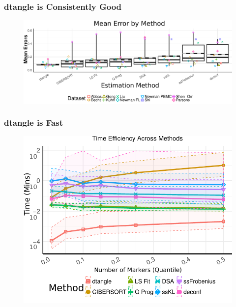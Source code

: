 \documentclass[usenames,dvipsnames,15pt]{beamer}
\begin{document}
\begin{frame}
  \frametitle{dtangle is Consistently Good}
  \begin{figure}
  \hspace*{-1cm}
  \includegraphics[scale=.499]{pictures/meta_boxplots.pdf}
  \end{figure}
\end{frame}

\begin{frame}
  \frametitle{dtangle is Fast}
  \begin{figure}
  \hspace*{-1cm}
  \includegraphics[scale=.8]{pictures/time_plot.pdf}
  \end{figure}
\end{frame}
\end{document}
